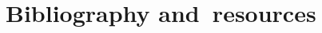 \documentclass{beamer}  %
\begin{document}


  






\section[]{Bibliography and~resources}
\end{document}
